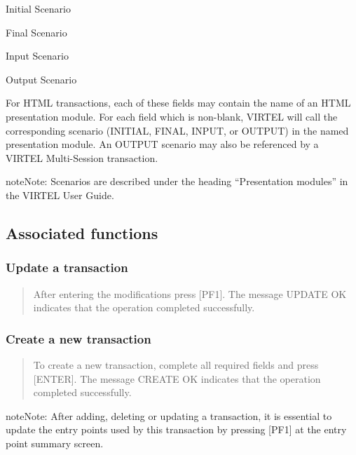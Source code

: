 \documentclass[letterpaper,10pt,english]{sphinxmanual}
\begin{document}
Initial Scenario

Final Scenario

Input Scenario

Output Scenario

For HTML transactions, each of these fields may contain the name of an HTML presentation module. For each field which is non-blank, VIRTEL will call the corresponding scenario (INITIAL, FINAL, INPUT, or OUTPUT) in the named presentation module. An OUTPUT scenario may also be referenced by a VIRTEL Multi-Session transaction.

\begin{sphinxadmonition}{note}{Note:}
Scenarios are described under the heading “Presentation modules” in the VIRTEL User Guide.
\end{sphinxadmonition}


\subsection{Associated functions}
\label{\detokenize{connectivity_guide:id18}}

\subsubsection{Update a transaction}
\label{\detokenize{connectivity_guide:update-a-transaction}}\begin{quote}

After entering the modifications press {[}PF1{]}. The message UPDATE OK indicates that the operation completed successfully.
\end{quote}


\subsubsection{Create a new transaction}
\label{\detokenize{connectivity_guide:create-a-new-transaction}}\begin{quote}

To create a new transaction, complete all required fields and press {[}ENTER{]}. The message CREATE OK indicates that the operation completed successfully.
\end{quote}

\begin{sphinxadmonition}{note}{Note:}
After adding, deleting or updating a transaction, it is essential to update the entry points used by this transaction by pressing {[}PF1{]} at the entry point summary screen.
\end{sphinxadmonition}
\end{document}
